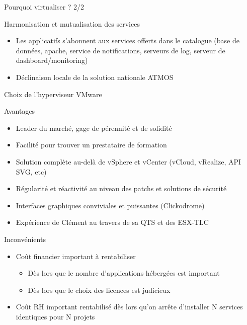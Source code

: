 \documentclass[10pt]{beamer}
\begin{document}
    \begin{frame}{Pourquoi virtualiser ? 2/2}
        \begin{block} {Harmonisation et mutualisation des services}
        \begin{itemize}
        \item Les applicatifs s’abonnent aux services offerts dans le catalogue (base de données, apache, service de notifications, serveurs de log, serveur de dashboard/monitoring) \pause
        \item Déclinaison locale de la solution nationale ATMOS
        \end{itemize}
    \end{block}
    \end{frame}
        
\begin{frame}{Choix de l'hyperviseur VMware}
\begin{block}{Avantages}
\begin{itemize}
\item Leader du marché, gage de pérennité et de solidité \pause
\item Facilité pour trouver un prestataire de formation \pause
\item Solution complète au-delà de vSphere et vCenter (vCloud, vRealize, API SVG, etc) \pause
\item Régularité et réactivité au niveau des patchs et solutions de sécurité \pause
\item Interfaces graphiques conviviales et puissantes (Clickodrome) \pause
\item Expérience de Clément au travers de sa QTS et des ESX-TLC \pause
\end{itemize}
\end{block}
\begin{block}{Inconvénients}
\begin{itemize}
\item Coût financier important à rentabiliser \pause
\begin{itemize}
    \item Dès lors que le nombre d’applications hébergées est important \pause
\item Dès lors que le choix des licences est judicieux \pause
\end{itemize}
\item Coût RH important rentabilisé dès lors qu’on arrête d’installer N services identiques pour N projets 
\end{itemize}
\end{block}
\end{frame}
\end{document}
